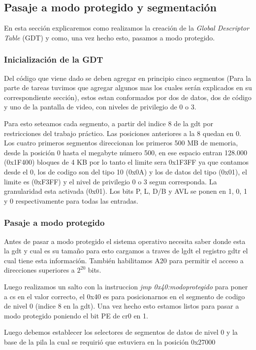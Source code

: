 \subsection{Pasaje a modo protegido y segmentación}
En esta sección explicaremos como realizamos la creación de la \textit{Global Descriptor Table} (GDT) y como, una vez hecho esto, pasamos a modo protegido.

\subsubsection{Inicialización de la GDT}
Del código que viene dado se deben agregar en principio cinco segmentos (Para la parte de tareas tuvimos que agregar algunos mas los cuales serán explicados en su correspondiente sección), estos estan conformados por dos de datos, dos de código y uno de la pantalla de video, con niveles de privilegio de 0 o 3.

Para esto seteamos cada segmento, a partir del indice 8 de la gdt por restricciones del trabajo práctico. Las posiciones anteriores a la 8 quedan en 0. Los cuatro primeros segmentos direccionan los primeros 500 MB de memoria, desde la posición 0 hasta el megabyte número 500, en ese espacio entran 128.000 (0x1F400) bloques de 4 KB por lo tanto el limite sera 0x1F3FF ya que contamos desde el 0, los de codigo son del tipo 10 (0x0A) y los de datos del tipo (0x01), el limite es (0xF3FF) y el nivel de privilegio 0 o 3 segun corresponda. La granularidad esta activada (0x01). Los bits P, L, D/B y AVL se ponen en 1, 0, 1 y 0 respectivamente para todas las entradas.

\subsubsection{Pasaje a modo protegido}

Antes de pasar a modo protegido el sistema operativo necesita saber donde esta la gdt y cual es su tamaño para esto cargamos a traves de lgdt el registro gdtr el cual tiene esta información. También habilitamos A20 para permitir el acceso a direcciones superiores a $2^{20}$ bits.

Luego realizamos un salto con la instruccion \textit{jmp 0x40:modoprotegido} para poner a cs en el valor correcto, el 0x40 es para posicionarnos en el segmento de codigo de nivel 0 (indice 8 en la gdt). Una vez hecho esto estamos listos para pasar a modo protegido poniendo el bit PE de cr0 en 1. 

Luego debemos establecer los selectores de segmentos de datos de nivel 0 y la base de la pila la cual se requirió que estuviera en la posición 0x27000

